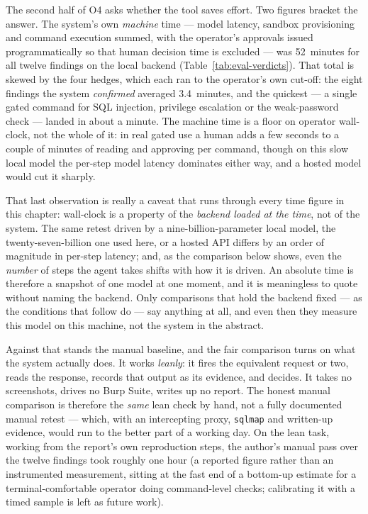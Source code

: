 The second half of O4 asks whether the tool saves effort. Two figures bracket the
answer. The system's own \emph{machine} time --- model latency, sandbox provisioning
and command execution summed, with the operator's approvals issued programmatically so
that human decision time is excluded --- was 52~minutes for all twelve findings on the
local backend (Table~\ref{tab:eval-verdicts}). That total is skewed by the four
hedges, which each ran to the operator's own cut-off: the eight findings the system
\emph{confirmed} averaged 3.4~minutes, and the quickest --- a single gated command for
SQL injection, privilege escalation or the weak-password check --- landed in about a
minute. The machine time is a floor on operator wall-clock, not the whole of it: in
real gated use a human adds a few seconds to a couple of minutes of reading and
approving per command, though on this slow local model the per-step model latency
dominates either way, and a hosted model would cut it sharply.

That last observation is really a caveat that runs through every time figure in this
chapter: wall-clock is a property of the \emph{backend loaded at the time}, not of the
system. The same retest driven by a nine-billion-parameter local model, the
twenty-seven-billion one used here, or a hosted API differs by an order of magnitude in
per-step latency; and, as the comparison below shows, even the \emph{number} of steps
the agent takes shifts with how it is driven. An absolute time is therefore a snapshot
of one model at one moment, and it is meaningless to quote without naming the backend.
Only comparisons that hold the backend fixed --- as the conditions that follow do ---
say anything at all, and even then they measure this model on this machine, not the
system in the abstract.

Against that stands the manual baseline, and the fair comparison turns on what the
system actually does. It works \emph{leanly}: it fires the equivalent request or two,
reads the response, records that output as its evidence, and decides. It takes no
screenshots, drives no Burp Suite, writes up no report. The honest manual comparison is
therefore the \emph{same} lean check by hand, not a fully documented manual retest ---
which, with an intercepting proxy, \texttt{sqlmap} and written-up evidence, would run to
the better part of a working day. On the lean task, working from the report's own
reproduction steps, the author's manual pass over the twelve findings took roughly one
hour (a reported figure rather than an instrumented measurement, sitting at the fast end
of a bottom-up estimate for a terminal-comfortable operator doing command-level checks;
calibrating it with a timed sample is left as future work).

